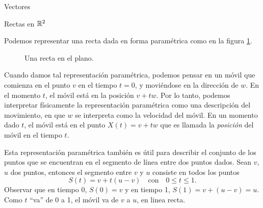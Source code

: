 \begin{chapter}{Vectores}
\begin{section}{Rectas en $\mathbb R^2$}
        
        Podemos representar una recta dada en forma paramétrica como en la figura \ref{fig-recta-parametrica}.
        \begin{figure}[h]
        	\centering
            \caption{Una recta en el plano.}
            \label{fig-recta-parametrica}
        \end{figure} 
        Cuando damos tal representación paramétrica, podemos pensar en un móvil que comienza en el punto $v$ en el tiempo $t = 0$, y moviéndose en la dirección de $w$. En el momento $t$, el móvil está en la posición $v+tw$. Por lo tanto, podemos interpretar físicamente la representación paramétrica como una descripción del movimiento, en que $w$ se interpreta como la velocidad del móvil. En un momento dado $t$, el móvil está en el punto $X(t) =v +tw$ que es  llamada la \textit{posición} del móvil en el tiempo $t$.
        
        Esta representación paramétrica también es útil para describir el conjunto de los puntos que se encuentran en el segmento de línea entre dos puntos dados. Sean $v$, $u$ dos puntos, entonces el segmento entre $v$ y $u$ consiste en todos los puntos
        \begin{equation}\label{eq-segmento-parametrico}
            S(t) = v + t(u-v)\quad  \text{con}\quad 0 \le t \le 1.
        \end{equation}
        Observar que en tiempo 0, $S(0) = v$ y  en tiempo 1, $S(1)= v + (u-v)= u$. Como $t$ ``va'' de 0 a 1,  el móvil va de $v$ a $u$,  en linea recta. %
        

\end{section}
\end{chapter}
